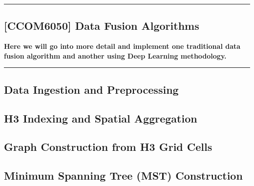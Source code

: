 {\color{gray}\hrule}
\begin{center}
\section{[CCOM6050] Data Fusion Algorithms}
\textbf{Here we will go into more detail and implement one traditional data fusion algorithm and another using Deep Learning methodology.}
\bigskip
\end{center}
{\color{gray}\hrule}

\begin{multicols}{2}

\subsection{Data Ingestion and Preprocessing}


\subsection{H3 Indexing and Spatial Aggregation}

\subsection{Graph Construction from H3 Grid Cells}

\subsection{Minimum Spanning Tree (MST) Construction}


\end{multicols}
